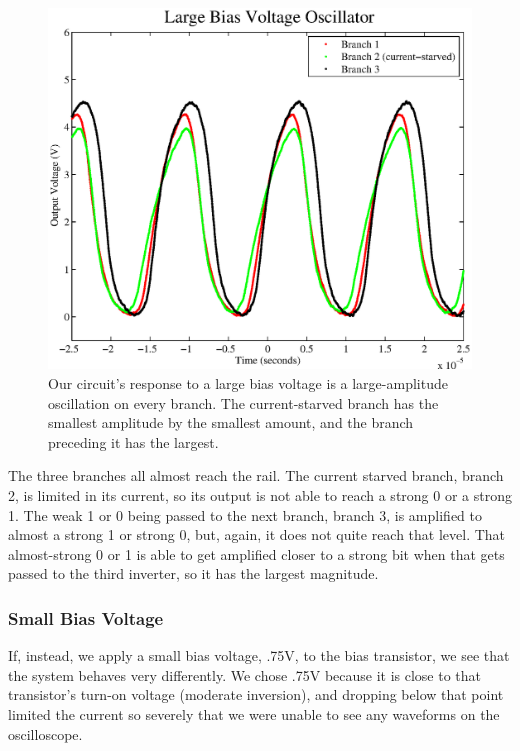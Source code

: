 \documentclass{article}
\begin{document}
\begin{figure}[H]
\centering
\includegraphics[scale=.6]{large_bias.eps}
\caption{Our circuit's response to a large bias voltage is a large-amplitude oscillation on every branch.  The current-starved branch has the smallest amplitude by the smallest amount, and the branch preceding it has the largest. }
\label{largeBias}
\end{figure}

The three branches all almost reach the rail.  The current starved branch, branch 2, is limited in its current, so its output is not able to reach a strong 0 or a strong 1.  The weak 1 or 0 being passed to the next branch, branch 3, is amplified to almost a strong 1 or strong 0, but, again, it does not quite reach that level.  That almost-strong 0 or 1 is able to get amplified closer to a strong bit when that gets passed to the third inverter, so it has the largest magnitude.

\subsubsection*{Small Bias Voltage}

If, instead, we apply a small bias voltage, .75V, to the bias transistor, we see that the system behaves very differently.  We chose .75V because it is close to that transistor's turn-on voltage (moderate inversion), and dropping below that point limited the current so severely that we were unable to see any waveforms on the oscilloscope.
\end{document}
